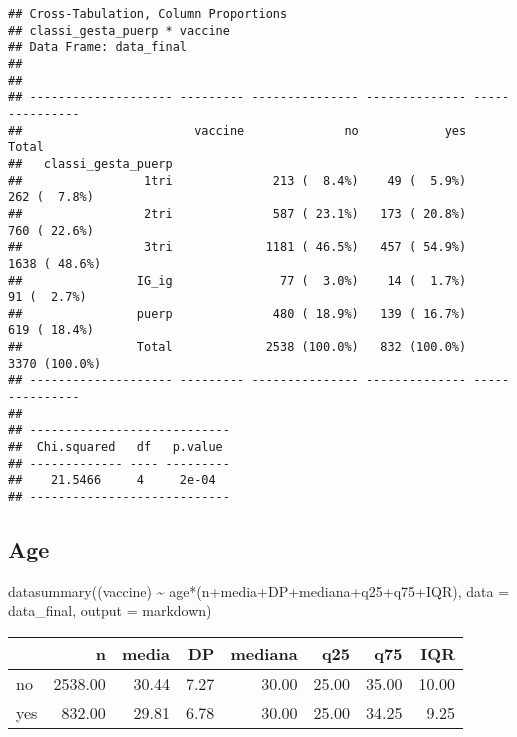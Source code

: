 \documentclass[
]{article}
\newenvironment{Shaded}{\begin{snugshade}}{\end{snugshade}}
\newcommand{\AttributeTok}[1]{\textcolor[rgb]{0.77,0.63,0.00}{#1}}
\newcommand{\FunctionTok}[1]{\textcolor[rgb]{0.00,0.00,0.00}{#1}}
\newcommand{\NormalTok}[1]{#1}
\newcommand{\SpecialCharTok}[1]{\textcolor[rgb]{0.00,0.00,0.00}{#1}}
\newcommand{\StringTok}[1]{\textcolor[rgb]{0.31,0.60,0.02}{#1}}
\begin{document}
\begin{verbatim}
## Cross-Tabulation, Column Proportions  
## classi_gesta_puerp * vaccine  
## Data Frame: data_final  
## 
## 
## -------------------- --------- --------------- -------------- ---------------
##                        vaccine              no            yes           Total
##   classi_gesta_puerp                                                         
##                 1tri              213 (  8.4%)    49 (  5.9%)    262 (  7.8%)
##                 2tri              587 ( 23.1%)   173 ( 20.8%)    760 ( 22.6%)
##                 3tri             1181 ( 46.5%)   457 ( 54.9%)   1638 ( 48.6%)
##                IG_ig               77 (  3.0%)    14 (  1.7%)     91 (  2.7%)
##                puerp              480 ( 18.9%)   139 ( 16.7%)    619 ( 18.4%)
##                Total             2538 (100.0%)   832 (100.0%)   3370 (100.0%)
## -------------------- --------- --------------- -------------- ---------------
## 
## ----------------------------
##  Chi.squared   df   p.value 
## ------------- ---- ---------
##    21.5466     4     2e-04  
## ----------------------------
\end{verbatim}

\hypertarget{age}{%
\subsection{Age}\label{age}}

\begin{Shaded}
\begin{Highlighting}[]
\FunctionTok{datasummary}\NormalTok{((vaccine) }\SpecialCharTok{\textasciitilde{}}\NormalTok{ age}\SpecialCharTok{*}\NormalTok{(n}\SpecialCharTok{+}\NormalTok{media}\SpecialCharTok{+}\NormalTok{DP}\SpecialCharTok{+}\NormalTok{mediana}\SpecialCharTok{+}\NormalTok{q25}\SpecialCharTok{+}\NormalTok{q75}\SpecialCharTok{+}\NormalTok{IQR),}
            \AttributeTok{data =}\NormalTok{ data\_final, }\AttributeTok{output =} \StringTok{\textquotesingle{}markdown\textquotesingle{}}\NormalTok{)}
\end{Highlighting}
\end{Shaded}

\begin{longtable}[]{@{}lrrrrrrr@{}}
\toprule
& n & media & DP & mediana & q25 & q75 & IQR \\
\midrule
\endhead
no & 2538.00 & 30.44 & 7.27 & 30.00 & 25.00 & 35.00 & 10.00 \\
yes & 832.00 & 29.81 & 6.78 & 30.00 & 25.00 & 34.25 & 9.25 \\
\bottomrule
\end{longtable}
\end{document}

